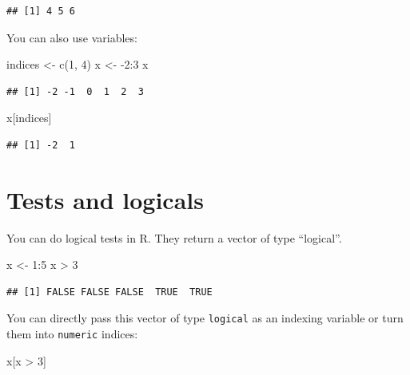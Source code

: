 \documentclass[
]{book}
\newenvironment{Shaded}{\begin{snugshade}}{\end{snugshade}}
\newcommand{\DecValTok}[1]{\textcolor[rgb]{0.00,0.00,0.81}{#1}}
\newcommand{\FunctionTok}[1]{\textcolor[rgb]{0.00,0.00,0.00}{#1}}
\newcommand{\NormalTok}[1]{#1}
\newcommand{\OtherTok}[1]{\textcolor[rgb]{0.56,0.35,0.01}{#1}}
\newcommand{\SpecialCharTok}[1]{\textcolor[rgb]{0.00,0.00,0.00}{#1}}
\begin{document}
\begin{verbatim}
## [1] 4 5 6
\end{verbatim}

You can also use variables:

\begin{Shaded}
\begin{Highlighting}[]
\NormalTok{indices }\OtherTok{\textless{}{-}} \FunctionTok{c}\NormalTok{(}\DecValTok{1}\NormalTok{, }\DecValTok{4}\NormalTok{)}
\NormalTok{x }\OtherTok{\textless{}{-}} \SpecialCharTok{{-}}\DecValTok{2}\SpecialCharTok{:}\DecValTok{3}
\NormalTok{x}
\end{Highlighting}
\end{Shaded}

\begin{verbatim}
## [1] -2 -1  0  1  2  3
\end{verbatim}

\begin{Shaded}
\begin{Highlighting}[]
\NormalTok{x[indices]}
\end{Highlighting}
\end{Shaded}

\begin{verbatim}
## [1] -2  1
\end{verbatim}

\hypertarget{tests-and-logicals}{%
\section{Tests and logicals}\label{tests-and-logicals}}

You can do logical tests in R. They return a vector of type ``logical''.

\begin{Shaded}
\begin{Highlighting}[]
\NormalTok{x }\OtherTok{\textless{}{-}} \DecValTok{1}\SpecialCharTok{:}\DecValTok{5}
\NormalTok{x }\SpecialCharTok{\textgreater{}} \DecValTok{3}
\end{Highlighting}
\end{Shaded}

\begin{verbatim}
## [1] FALSE FALSE FALSE  TRUE  TRUE
\end{verbatim}

You can directly pass this vector of type \texttt{logical} as an indexing variable or turn them into \texttt{numeric} indices:

\begin{Shaded}
\begin{Highlighting}[]
\NormalTok{x[x }\SpecialCharTok{\textgreater{}} \DecValTok{3}\NormalTok{]}
\end{Highlighting}
\end{Shaded}
\end{document}
